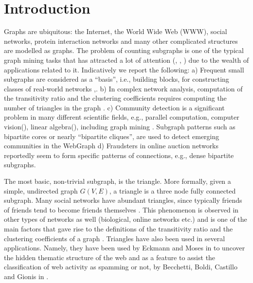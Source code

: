 \documentclass{llncs}
\begin{document}
\section{Introduction}
\label{sec:intro}


Graphs are ubiquitous: the Internet, the World Wide Web (WWW), social networks, protein interaction networks 
and many other complicated structures are modelled as graphs. 
The problem of counting subgraphs is one of the typical graph mining tasks that has attracted 
a lot of attention (\cite{gspan}, \cite{closegraph}, \cite{yan2004} ) due to the wealth of applications related to it.
Indicatively we report the following:
a) Frequent small subgraphs are considered as a ``basis'', i.e., building blocks, for 
constructing classes of real-world networks \cite{milo:triangles},\cite{arena:com}.
b) In complex network analysis, computation of the transitivity ratio and the clustering 
coefficients requires computing the number of triangles in the graph \cite{newman:structure}. 
c) Community detection is a significant problem in many different scientific fields, e.g., parallel computation,
computer vision(\cite{ncut}), linear algebra(\cite{metis}), including graph mining \cite{leskovec,myra,metis}. 
Subgraph patterns such as bipartite cores or nearly ``bipartite cliques'', are used to detect emerging communities in the WebGraph \cite{kumar}
d) Fraudsters in online auction networks reportedly \cite{polo} seem to form specific patterns of connections, e.g., dense bipartite subgraphs.

The most basic, non-trivial subgraph, is the triangle. More formally, 
given a simple, undirected graph $G(V,E)$, a triangle is a three node fully connected subgraph. 
Many social networks have abundant triangles, since typically friends
of friends tend to become friends themselves \cite{faust:social}. This phenomenon is observed
in other types of networks as well (biological, online networks etc.) and is one of the main factors that 
gave rise to the definitions of the transitivity ratio  and the clustering coefficients of a graph \cite{newman:structure}.
Triangles have also been used in several applications. Namely, they have been used 
by Eckmann and Moses in \cite{eckman:thematic} to uncover the hidden thematic structure of the web and as a feature
to assist the classification of web activity as spamming or not, 
by Becchetti, Boldi, Castillo and Gionis in \cite{gionis:spam}.
\end{document}
